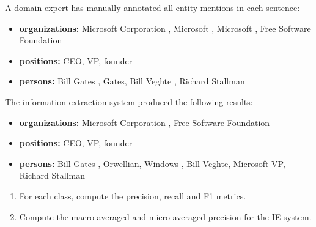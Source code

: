 \documentclass[12pt]{article}
\begin{document}
A domain expert has manually annotated all entity mentions in each sentence:

\begin{itemize}
\item {\bf organizations:} Microsoft Corporation , Microsoft , Microsoft , Free Software Foundation
\item {\bf positions:} CEO, VP, founder
\item {\bf persons:} Bill Gates , Gates, Bill Veghte , Richard Stallman
\end{itemize}

The information extraction system produced the following results:

\begin{itemize}
\item {\bf organizations:} Microsoft Corporation , Free Software Foundation
\item {\bf positions:} CEO, VP, founder
\item {\bf persons:} Bill Gates , Orwellian, Windows , Bill Veghte, Microsoft VP, Richard Stallman
\end{itemize}

\begin{enumerate}
\item For each class, compute the precision, recall and F1 metrics.
\item Compute the macro-averaged and micro-averaged precision for the IE system.
\end{enumerate}
\end{document}
